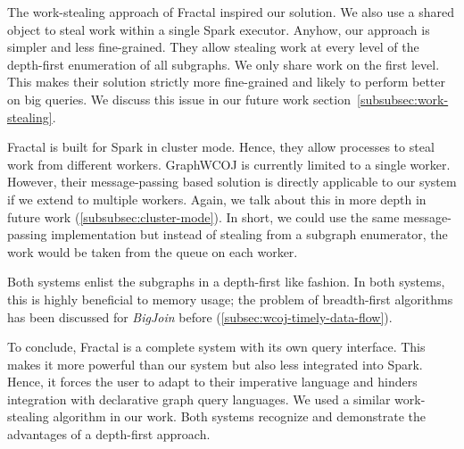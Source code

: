 The work-stealing approach of Fractal inspired our solution.
We also use a shared object to steal work within a single Spark executor.
Anyhow, our approach is simpler and less fine-grained.
They allow stealing work at every level of the depth-first enumeration of all subgraphs.
We only share work on the first level.
This makes their solution strictly more fine-grained and likely to perform better on big
queries.
We discuss this issue in our future work section~\ref{subsubsec:work-stealing}.

Fractal is built for Spark in cluster mode.
Hence, they allow processes to steal work from different workers.
GraphWCOJ is currently limited to a single worker.
However, their message-passing based solution is directly applicable to our system if
we extend to multiple workers.
Again, we talk about this in more depth in future work (\ref{subsubsec:cluster-mode}).
In short, we could use the same message-passing implementation but instead of stealing
from a subgraph enumerator, the work would be taken from the queue on each worker.

Both systems enlist the subgraphs in a depth-first like fashion.
In both systems, this is highly beneficial to memory usage;
the problem of breadth-first algorithms has been discussed for \textit{BigJoin} before (\cref{subsec:wcoj-timely-data-flow}).

To conclude, Fractal is a complete system with its own query interface.
This makes it more powerful than our system but also less integrated into Spark.
Hence, it forces the user to adapt to their imperative language and hinders
integration with declarative graph query languages.
We used a similar work-stealing algorithm in our work.
Both systems recognize and demonstrate the advantages of a depth-first approach.


